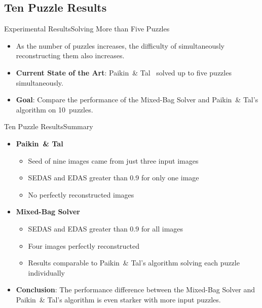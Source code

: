 \documentclass[10pt]{beamer}
\newcommand{\backupend}{
   \setcounter{framenumber}{\value{finalframe}}
}
\begin{document}
\subsection{Ten Puzzle Results}
\begin{frame}{Experimental Results}{Solving More than Five Puzzles}
  \begin{itemize}
	  \item<1-> As the number of puzzles increases, the difficulty of simultaneously reconstructing them also increases.
	  \vfill  
  	\item<2-> \textbf{Current State of the Art}: Paikin~\& Tal~\cite{paikin2015} solved up to five puzzles simultaneously.
	  \vfill
  	\item<3-> \textbf{Goal}: Compare the performance of the Mixed-Bag Solver and Paikin~\& Tal's algorithm on 10~puzzles.
  \end{itemize}
\end{frame}


\begin{frame}{Ten Puzzle Results}{Summary}
  	\begin{itemize}
  		\item<1-> \textbf{Paikin~\& Tal}
  		\begin{itemize}
  		  \setlength\itemsep{0.7em}
			  \item Seed of nine images came from just three input images
			  \item SEDAS and EDAS greater than 0.9 for only one image
			  \item No perfectly reconstructed images
		  \end{itemize}
		  \vfill
  	  \item<2-> \textbf{Mixed-Bag Solver}
		  \begin{itemize}
		    \setlength\itemsep{0.7em}
			  \item SEDAS and EDAS greater than 0.9 for all images
			  \item Four images perfectly reconstructed
			  \item Results comparable to Paikin~\& Tal's algorithm solving each puzzle individually
		  \end{itemize}	
		  \vfill
  		\item<3-> \textbf{Conclusion}: The performance difference between the Mixed-Bag Solver and Paikin~\& Tal's algorithm is even starker with more input puzzles.
  \end{itemize}
\end{frame}





\backupend
\end{document}
